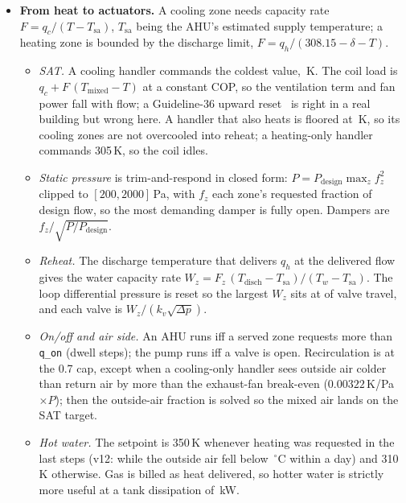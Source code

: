 \documentclass{article}
\begin{document}
\begin{itemize}
\begin{itemize}
  \item \emph{Setback bursts.} A running handler pays the ventilation load of every zone it serves. The floor (eco band widened by \ParNightLowExt{}/\ParNightHighExt\,K) is therefore held by requesting \ParQSbW\,W from any zone that crosses it until it is \ParSbHystK\,K inside, and the handler is off otherwise. Holding the floor with the PI loops instead kept a handler running for \VthreeAhuOnUnocc{} of the unoccupied steps on the coldest scenario.
  \end{itemize}
\item \textbf{From heat to actuators.} A cooling zone needs capacity rate $F = q_c/(T - T_{\text{sa}})$, $T_{\text{sa}}$ being the AHU's estimated supply temperature; a heating zone is bounded by the discharge limit, $F = q_h/(308.15 - \delta - T)$.
  \begin{itemize}
  \item \emph{SAT.} A cooling handler commands the coldest value, \ParSatCoolHi\,K. The coil load is $q_c + F\,(T_{\text{mixed}} - T)$ at a constant COP, so the ventilation term and fan power fall with flow; a Guideline-36 upward reset~\citep{ashrae2021g36,taylor2018vav} is right in a real building but wrong here. A handler that also heats is floored at \ParSatMixFloor\,K, so its cooling zones are not overcooled into reheat; a heating-only handler commands 305\,K, so the coil idles.
  \item \emph{Static pressure} is trim-and-respond in closed form: $P = P_{\text{design}}\max_z f_z^2$ clipped to $[200, 2000]$\,Pa, with $f_z$ each zone's requested fraction of design flow, so the most demanding damper is fully open. Dampers are $f_z/\sqrt{P/P_{\text{design}}}$.
  \item \emph{Reheat.} The discharge temperature that delivers $q_h$ at the delivered flow gives the water capacity rate $W_z = F_z\,(T_{\text{disch}} - T_{\text{sa}})/(T_w - T_{\text{sa}})$. The loop differential pressure is reset so the largest $W_z$ sits at \ParValveTarget{} of valve travel, and each valve is $W_z/(k_v \sqrt{\Delta p})$.
  \item \emph{On/off and air side.} An AHU runs iff a served zone requests more than \texttt{q\_on} (dwell \ParMinOnSteps{} steps); the pump runs iff a valve is open. Recirculation is at the 0.7 cap, except when a cooling-only handler sees outside air colder than return air by more than the exhaust-fan break-even ($0.00322$\,K/Pa$\times P$); then the outside-air fraction is solved so the mixed air lands on the SAT target.
  \item \emph{Hot water.} The setpoint is 350\,K whenever heating was requested in the last \ParHeatSeasonSteps{} steps (v12: \RTenSeasonSteps{} while the outside air fell below \RTenSeasonOatC\,$^\circ$C within a day) and 310\,K otherwise. Gas is billed as heat delivered, so hotter water is strictly more useful at a tank dissipation of \TankLossExtraKw\,kW.

\end{itemize}
\end{itemize}
\end{document}
